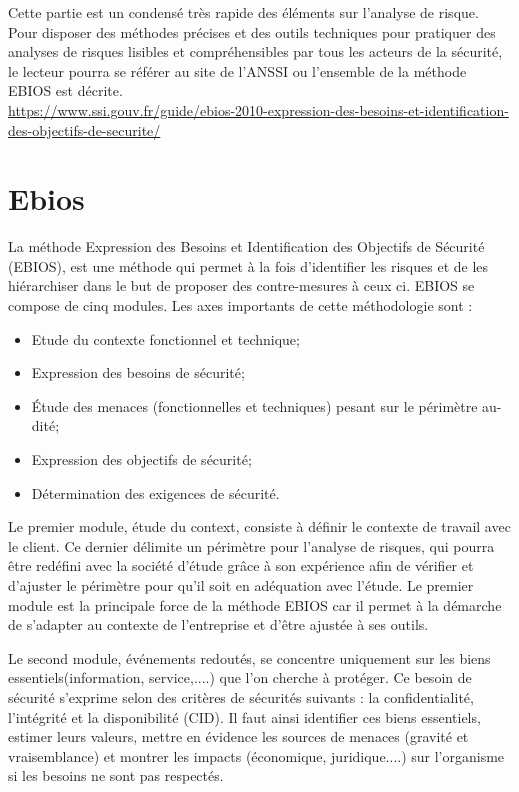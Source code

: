 \begin{nota}
Cette partie est un condensé très rapide des éléments sur l'analyse de risque. Pour disposer des méthodes précises et des outils techniques pour pratiquer des analyses de risques lisibles et compréhensibles par tous les acteurs de la sécurité, le lecteur pourra se référer au site de l’ANSSI ou l’ensemble de la méthode EBIOS est décrite.\\
\tiny \url{https://www.ssi.gouv.fr/guide/ebios-2010-expression-des-besoins-et-identification-des-objectifs-de-securite/}
\end{nota}

\section{Ebios}
La méthode Expression des Besoins et Identification des Objectifs de Sécurité (EBIOS), est une méthode qui permet à la fois d’identifier les risques et de les hiérarchiser dans le but de proposer des contre-mesures à ceux ci. 
EBIOS se compose de cinq modules. Les axes importants de cette méthodologie sont :

\begin{itemize}
  \item Etude du contexte fonctionnel et technique;
  \item Expression des besoins de sécurité;
  \item Étude des menaces (fonctionnelles et techniques) pesant sur le périmètre au-dité;
  \item Expression des objectifs de sécurité;
  \item Détermination des exigences de sécurité.
\end{itemize}

Le premier module, étude du context, consiste à définir le contexte de travail avec le client. Ce dernier délimite un périmètre pour l’analyse de risques, qui pourra être redéfini avec la société d’étude grâce à son expérience afin de vérifier et d’ajuster le périmètre pour qu’il soit en adéquation avec l’étude. Le premier module est la principale force de la méthode EBIOS car il permet à la démarche de s’adapter au contexte de l’entreprise et d’être ajustée à ses outils.

Le second module, événements redoutés, se concentre uniquement sur les biens essentiels(information, service,....) que l’on cherche à protéger. Ce besoin de sécurité s’exprime selon des critères de sécurités suivants : la confidentialité, l’intégrité et la disponibilité (CID). Il faut ainsi identifier ces biens essentiels, estimer leurs valeurs, mettre en évidence les sources de menaces (gravité et vraisemblance) et montrer les impacts (économique, juridique....) sur l’organisme si les besoins ne sont pas respectés.

